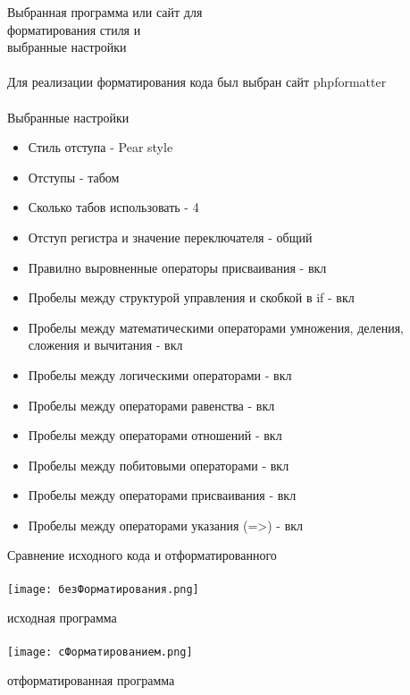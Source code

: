 \documentclass{article}
\begin{document}
\newpage
\huge{Выбранная программа или сайт для \\ форматирования стиля и \\ выбранные настройки} \\ \\
\Large{Для реализации форматирования кода был выбран сайт phpformatter}
\\ \\
\Large{Выбранные настройки}\\
\begin{itemize}
    \item  Стиль отступа - Pear style
    \item  Отступы - табом
    \item  Сколько табов использовать - 4
    \item  Отступ регистра и значение переключателя - общий
    \item  Правилно выровненные операторы присваивания - вкл
    \item  Пробелы между структурой управления и скобкой в if - вкл
    \item  Пробелы между математическими операторами умножения, деления, сложения и вычитания - вкл
    \item  Пробелы между логическими операторами - вкл
    \item  Пробелы между операторами равенства - вкл
    \item  Пробелы между операторами отношений - вкл
    \item  Пробелы между побитовыми операторами - вкл
    \item  Пробелы между операторами присваивания - вкл
    \item  Пробелы между операторами указания (=>) - вкл
\end{itemize}
\newpage
\huge{Сравнение исходного кода и отформатированного} \\ \\
\texttt{[image: безФорматирования.png]}

\large{исходная программа}
\\ \\
\texttt{[image: сФорматированием.png]}

\large{отформатированная программа}
\end{document}
